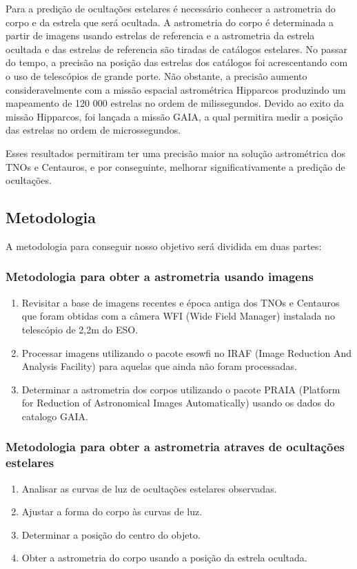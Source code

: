 \documentclass[a4paper, 11pt]{article}
\begin{document}
Para a predição de ocultações estelares é necessário conhecer a astrometria do corpo e da estrela que será ocultada. A astrometria do corpo é determinada a partir de imagens usando estrelas de referencia e a astrometria da estrela ocultada e das estrelas de referencia são tiradas de catálogos estelares. No passar do tempo, a precisão na posição das estrelas dos catálogos foi acrescentando com o uso de telescópios de grande porte. Não obstante, a precisão aumento consideravelmente com a missão espacial astrométrica Hipparcos produzindo um mapeamento de 120 000 estrelas no ordem de milissegundos. Devido ao exito da missão Hipparcos, foi lançada a missão GAIA, a qual permitira medir a posição das estrelas no ordem de microssegundos.

Esses resultados permitiram ter uma precisão maior na solução astrométrica dos TNOs e Centauros, e por conseguinte, melhorar significativamente a predição de ocultações.
\newpage     
\subsection{Metodologia}

A metodologia para conseguir nosso objetivo será dividida em duas partes:

\subsubsection{Metodologia para obter a astrometria usando imagens}
\begin{enumerate}
  \item Revisitar a base de imagens recentes e época antiga dos TNOs e Centauros que foram obtidas com a câmera WFI (Wide Field Manager) instalada no telescópio de 2,2m do ESO.
  \item Processar imagens utilizando o pacote esowfi no IRAF (Image Reduction And Analysis Facility) para aquelas que ainda não foram processadas.
  \item Determinar a astrometria dos corpos utilizando o pacote PRAIA (Platform for Reduction of Astronomical Images Automatically) usando os dados do catalogo GAIA.
\end{enumerate}
\subsubsection{Metodologia para obter a astrometria atraves de ocultações estelares}
\begin{enumerate}
  \item Analisar as curvas de luz de ocultações estelares observadas.
  \item Ajustar a forma do corpo às curvas de luz.
  \item Determinar a posição do centro do objeto.
  \item Obter a astrometria do corpo usando a posição da estrela ocultada.
\end{enumerate}
\end{document}
